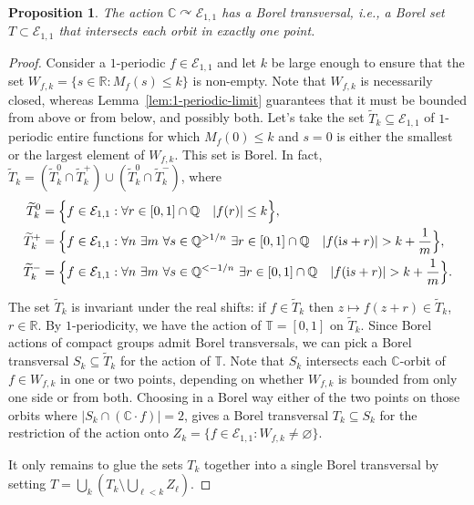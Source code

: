 \documentclass[12pt]{paper}
\numberwithin{equation}{section}
\theoremstyle{plain}
\newtheorem{proposition}[theorem]{Proposition}
\theoremstyle{definition}
\newcommand{\C}{\mathbb{C}}
\newcommand{\Q}{\mathbb{Q}}
\newcommand{\R}{\mathbb{R}}
\newcommand{\T}{\mathbb{T}}
\newcommand{\im}{\mathrm{i}} %
\newcommand{\holom}[1][]{\mathcal{E}_{#1}}
\newcommand{\acts}{\curvearrowright}
\begin{document}
\begin{proposition}
  \label{prop:action-on-H1-smooth}
  The action \(\C \acts \holom[1,1]\) has a Borel transversal, i.e., a Borel set
  \(T \subset \holom[1,1]\) that intersects each orbit in exactly one point.
\end{proposition}

\begin{proof}
  Consider a \(1\)-periodic \(f \in \holom[1,1]\) and let \(k\) be large enough to ensure that the
  set \(W_{f,k} = \{s \in \R : M_{f}(s) \le k\}\) is non-empty.  Note that \(W_{f,k}\) is
  necessarily closed, whereas Lemma~\ref{lem:1-periodic-limit} guarantees that it must be bounded
  from above or from below, and possibly both. Let's take the set
  \(\widetilde{T}_{k} \subseteq \holom[1,1]\) of \(1\)-periodic entire functions for which
  \(M_{f}(0) \le k\) and \(s = 0\) is either the smallest or the largest element of \(W_{f,k}\).
  This set is Borel.  In fact,
  \(\widetilde{T}_{k} = (\widetilde{T}^{0}_{k} \cap \widetilde{T}^{+}_{k}) \cup
  (\widetilde{T}^{0}_{k} \cap \widetilde{T}^{-}_{k})\), where
  \begin{displaymath}
    \begin{aligned}
      \widetilde{T}^{0}_{k} &= \Bigl\{f \in \holom[1,1] : \forall r \in [0,1] \cap \Q \quad |f(r)| \le k \Bigr\},  \\
      \widetilde{T}^{+}_{k} &= \Bigl\{ f \in \holom[1,1] : \forall n\ \exists m\ \forall s \in
                              \Q^{>1/n}\ \exists r \in [0,1] \cap \Q \quad
                              |f(\im s +r)|> k + \frac{1}{m} \Bigr\},\\
      \widetilde{T}^{-}_{k} &= \Bigl\{ f \in \holom[1,1] : \forall n\ \exists m\ \forall s \in
                              \Q^{< -1/n}\ \exists r \in [0,1] \cap \Q \quad
                              |f(\im s +r)|> k + \frac{1}{m} \Bigr\}.\\
    \end{aligned}
  \end{displaymath}


  The set \(\widetilde{T}_{k}\) is invariant under the real shifts: if \(f \in \widetilde{T}_{k}\)
  then \(z \mapsto f(z + r) \in \widetilde{T}_{k}\), \(r \in \R\).  By \(1\)-periodicity, we have
  the action of \(\T = [0,1]\) on \(\widetilde{T}_{k}\).  Since Borel actions of compact groups
  admit Borel transversals, we can pick a Borel transversal \(S_{k} \subseteq \widetilde{T}_{k}\)
  for the action of \(\T\).  Note that \(S_{k}\) intersects each \(\C\)-orbit of \(f \in W_{f,k}\)
  in one or two points, depending on whether \(W_{f,k}\) is bounded from only one side or from both.
  Choosing in a Borel way either of the two points on those orbits where
  \(|S_{k} \cap (\C \cdot f)| = 2\), gives a Borel transversal \(T_{k} \subseteq S_{k}\) for the
  restriction of the action onto \(Z_{k} = \{f \in \holom[1,1] : W_{f,k} \ne \varnothing\}\).

  It only remains to glue the sets \(T_k\) together into a single Borel transversal by setting
  \(T=\bigcup_{k} \left(T_k\setminus \bigcup_{\ell<k}Z_{\ell}\right)\).
\end{proof}
\end{document}

